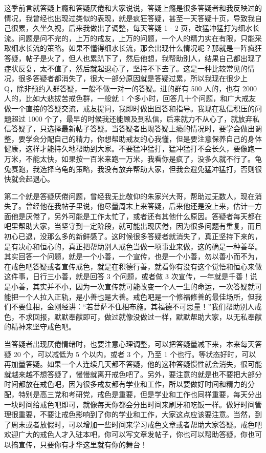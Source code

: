 这季前言就答疑上瘾和答疑厌倦和大家说说，答疑上瘾是很多答疑者和我反映过的情况，我曾经也出现过类似的表现，就是疯狂答疑，甚至一天答疑十页，导致我自己很累，久坐久视，后来我做出了调整，每天答疑 1 - 2 页，改猛冲猛打为细水长流。问题是问不完的，上万的戒友，上万的问题，一个人的精力实在有限，只能采取细水长流的策略。如果不懂得细水长流，那会出现什么情况呢？那就是一阵疯狂答疑，帖子是火了，但人也累趴下了，然后他想，我帮助别人，结果自己都出现了症状反复，太不值了，然后就起退心了，坚持不下去了。这是一种比较常见的情况，很多答疑者都消失了，很大一部分原因就是答疑过累，所以我现在很少上 Q，除非预约入群答疑，一般不做一对一的答疑。进的群有 500 人的，也有 2000 人的，比如大悲拔苦戒色群，一般就 1 个多小时，回答几十个问题，和广大戒友做一个直接的答疑交流，戒友提问，我即时做出回答和指导。我现在私信积压的问题超过 1000 个了，最早的时候我还能顾及到私信，后来就力不从心了，就放弃私信答疑了，只选择最新帖子答疑。当答疑者出现答疑上瘾的情况时，要学会做出调整，要学会分配自己的精力，你想帮助戒友的心我懂，但是要注意保养自己的身体健康，这样才能持久地帮助到大家。不要猛冲猛打，猛冲猛打不会长久，要像跑一万米，不能太快，如果按一百米来跑一万米，我看你是疯了，没多久就不行了。龟兔赛跑，我选择乌龟的策略，我没有放弃帮助大家，但我会避免猛冲猛打，否则很快就会起退心。

第二个就是答疑厌倦问题，曾经我无比敬仰的朱家兴大哥，帮助过无数人，现在消失了。曾经他在我帖子里说，他尽量周末上来答疑，后来他还是没上来，估计一方面他是厌倦了，另外可能是工作太忙了，或者还有其他什么原因。答疑者每天都在吧里帮助大家，当坚守到一定阶段，就可能出现厌倦，因为很多问题有重复，而且初心已退，没那么多的新鲜感了。这时候很多答疑者就消失了，真正坚持下来的，是有决心和恒心的，真正把帮助别人戒色当做一项事业来做，这的确是一种善举。其实回答一个问题，就是一个小善，一个宣传，也是一个小善，勿以善小而不为，在戒色吧答疑或者宣传戒色，就是在积德行善，就看你有没有这个觉悟和恒心来做这件事，日行三小善，就是回答 3 个问题，或者做 3 次宣传，一年就是千善！说是小善，其实并不小，因为一次宣传就可能改变一个人一生的命运，一次答疑就可能把一个人拉入正轨，是小善也是大善。戒色吧是一个修福修善的最佳场所，但我们不要住相，金刚经讲：“若菩萨不住相布施。其福德不可思量！”我们帮助别人戒色，不求回报，默默奉献即可，做过就像没做过一样，默默帮助大家，以无私奉献的精神来坚守戒色吧。

当答疑者出现厌倦情绪时，也要注意心理调整，可以把答疑量减下来，本来每天答疑 20 个，可以减低为 5 个以内，或者 3 个，乃至 1 个也行。等状态好时，可以再加量答疑。如果一个人连续几天都不答疑，他的这种答疑惯性就会消失，很可能就越来越不想答疑了，慢慢就离开戒色吧了。另外，要注意的就是也不要把大部分时间都放在戒色吧，因为很多戒友都有学业和工作，所以要做好时间和精力的分配，特别是高三党和考研党，戒色是重要，但是学业和工作也同样重要，每天分出一块时间给戒色吧即可，就像每天你都会分出时间来刷牙和吃饭一样。做好时间管理很重要，不要让戒色影响到了你的学业和工作，大家这点应该要注意。当然，到了周末或者放假时，可以增加一些时间来学习戒色文章或者帮助大家答疑。戒色吧欢迎广大的戒色人才入驻本吧，你可以写文章发帖子，你也可以帮助答疑，你也可以搞宣传，只要你有才华这里就有你的舞台！

